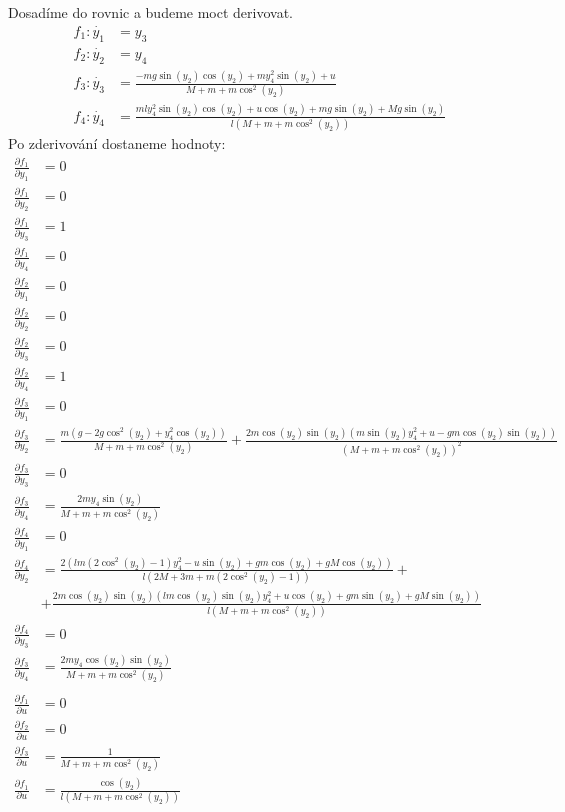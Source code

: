 \documentclass[a4paper, 12pt]{article}
\begin{document}
			Dosadíme do rovnic a budeme moct derivovat.
			\begin{align*}
				f_1: \dot{y_1} &= y_3\\
				f_2: \dot{y_2} &= y_4\\
				f_3: \dot{y_3} &= \frac{-mg\sin(y_2)\cos(y_2)+my_4^2\sin(y_2)+u}{M+m+m\cos^2(y_2)}\\
				f_4: \dot{y_4} &= \frac{mly_4^2\sin(y_2)\cos(y_2)+u\cos(y_2)+mg\sin(y_2)+Mg\sin(y_2)}{l\left(M+m+m\cos^2(y_2)\right)}
			\end{align*}
			Po zderivování dostaneme hodnoty:
			\begin{align*}
				\frac{\partial f_1}{\partial y_1} &= 0\\
				\frac{\partial f_1}{\partial y_2} &= 0\\
				\frac{\partial f_1}{\partial y_3} &= 1\\
				\frac{\partial f_1}{\partial y_4} &= 0\\
				\frac{\partial f_2}{\partial y_1} &= 0\\
				\frac{\partial f_2}{\partial y_2} &= 0\\
				\frac{\partial f_2}{\partial y_3} &= 0\\
				\frac{\partial f_2}{\partial y_4} &= 1\\
				\frac{\partial f_3}{\partial y_1} &= 0\\
				\frac{\partial f_3}{\partial y_2} &= \frac{m\left(g-2g\cos^2(y_2)+y_4^2\cos(y_2)\right)}{M+m+m\cos^2(y_2)}+\frac{2m\cos(y_2)\sin(y_2)\left(m\sin(y_2)y_4^2+u-gm\cos(y_2)\sin(y_2)\right)}{\left(M+m+m\cos^2(y_2)\right)^2}\\
				\frac{\partial f_3}{\partial y_3} &= 0 \\
				\frac{\partial f_3}{\partial y_4} &= \frac{2my_4\sin(y_2)}{M+m+m\cos^2(y_2)}\\
				\frac{\partial f_4}{\partial y_1} &= 0\\
				\frac{\partial f_4}{\partial y_2} &= \frac{2\left(lm\left(2\cos^2(y_2)-1\right)y_4^2-u\sin(y_2)+gm\cos(y_2)+gM\cos(y_2)\right)}{l\left(2M+3m+m\left(2\cos^2(y_2)-1\right)\right)}+\\
				&+\frac{2m\cos(y_2)\sin(y_2)\left(lm\cos(y_2)\sin(y_2)y_4^2+u\cos(y_2)+gm\sin(y_2)+gM\sin(y_2)\right)}{l\left(M+m+m\cos^2(y_2)\right)}\\
				\frac{\partial f_4}{\partial y_3} &= 0\\
				\frac{\partial f_3}{\partial y_4} &= \frac{2my_4\cos(y_2)\sin(y_2)}{M+m+m\cos^2(y_2)}\\
				\\
				\frac{\partial f_1}{\partial u} &= 0\\
				\frac{\partial f_2}{\partial u} &= 0\\
				\frac{\partial f_3}{\partial u} &= \frac{1}{M+m+m\cos^2(y_2)}\\	
			    \frac{\partial f_1}{\partial u} &= \frac{\cos(y_2)}{l\left(M+m+m\cos^2(y_2)\right)}
			\end{align*}
\end{document}
